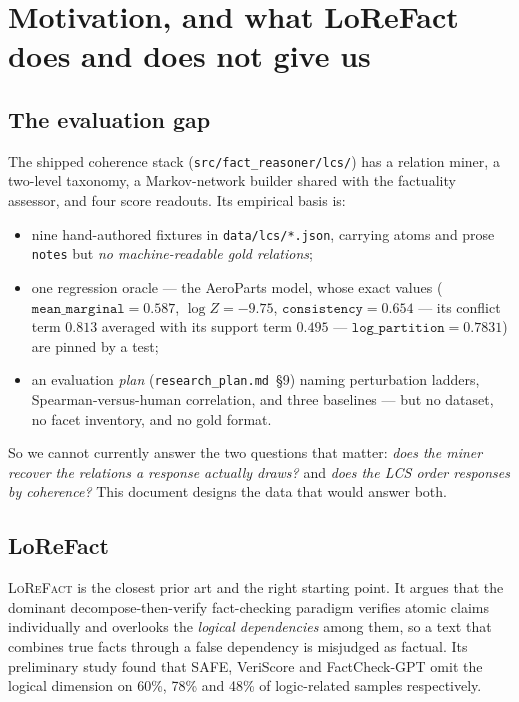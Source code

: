 \documentclass[11pt]{article}
\newcommand{\readout}[1]{\texttt{#1}}
\begin{document}
\tableofcontents

\section{Motivation, and what LoReFact does and does not give us}
\label{sec:motivation}

\subsection{The evaluation gap}

The shipped coherence stack (\texttt{src/fact\_reasoner/lcs/}) has a relation miner, a
two-level taxonomy, a Markov-network builder shared with the factuality assessor, and four
score readouts. Its empirical basis is:

\begin{itemize}[leftmargin=*,nosep]
  \item nine hand-authored fixtures in \texttt{data/lcs/*.json}, carrying atoms and prose
        \texttt{notes} but \emph{no machine-readable gold relations};
  \item one regression oracle --- the AeroParts model, whose exact values
        ($\readout{mean\_marginal}=0.587$, $\log Z=-9.75$, $\readout{consistency}=0.654$
        --- its conflict term $0.813$ averaged with its support term $0.495$ ---
        $\readout{log\_partition}=0.7831$) are pinned by a test;
  \item an evaluation \emph{plan} (\texttt{research\_plan.md}~\S9) naming perturbation
        ladders, Spearman-versus-human correlation, and three baselines
        \citep{discoscore,geval,selfcheckgpt} --- but no dataset, no facet inventory, and
        no gold format.
\end{itemize}

So we cannot currently answer the two questions that matter: \emph{does the miner recover the
relations a response actually draws?} and \emph{does the LCS order responses by coherence?}
This document designs the data that would answer both.

\subsection{LoReFact}

\textsc{LoReFact} \citep{lorefact} is the closest prior art and the right starting point. It
argues that the dominant decompose-then-verify fact-checking paradigm verifies atomic claims
individually and overlooks the \emph{logical dependencies} among them, so a text that combines
true facts through a false dependency is misjudged as factual. Its preliminary study found
that SAFE, VeriScore and FactCheck-GPT omit the logical dimension on 60\%, 78\% and 48\% of
logic-related samples respectively.
\end{document}
